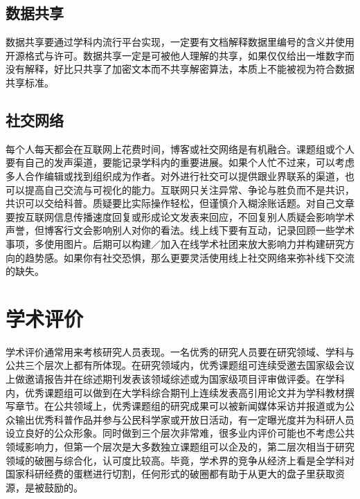 \documentclass[]{tufte-book}
\begin{document}
\hypertarget{ux6570ux636eux5171ux4eab}{%
\subsection{数据共享}\label{ux6570ux636eux5171ux4eab}}

数据共享要通过学科内流行平台实现，一定要有文档解释数据里编号的含义并使用开源格式与许可。数据共享一定是可被他人理解的共享，如果仅仅给出一堆数字而没有解释，好比只共享了加密文本而不共享解密算法，本质上不能被视为符合数据共享标准。

\hypertarget{ux793eux4ea4ux7f51ux7edc}{%
\subsection{社交网络}\label{ux793eux4ea4ux7f51ux7edc}}

每个人每天都会在互联网上花费时间，博客或社交网络是有机融合。课题组或个人要有自己的发声渠道，要能记录学科内的重要进展。如果个人忙不过来，可以考虑多人合作编辑或找到组织成为作者。对外进行社交可以提供跟业界联系的渠道，也可以提高自己交流与可视化的能力。互联网只关注异常、争论与胜负而不是共识，共识可以交给科普。质疑要比实际操作轻松，但谨慎介入糊涂账话题。对自己文章要按互联网信息传播速度回复或形成论文发表来回应，不回复别人质疑会影响学术声誉，但博客行文会影响别人对你的看法。线上线下要有互动，记录回顾一些学术事项，多使用图片。后期可以构建／加入在线学术社团来放大影响力并构建研究方向的趋势感。如果你有社交恐惧，那么更要灵活使用线上社交网络来弥补线下交流的缺失。

\hypertarget{ux5b66ux672fux8bc4ux4ef7}{%
\section{学术评价}\label{ux5b66ux672fux8bc4ux4ef7}}

学术评价通常用来考核研究人员表现。一名优秀的研究人员要在研究领域、学科与公共三个层次上都有所体现。在研究领域内，优秀课题组可连续受邀去国家级会议上做邀请报告并在综述期刊发表该领域综述或为国家级项目评审做评委。在学科内，优秀课题组可以做到在大学科综合期刊上连续发表高引用论文并为学科教材撰写章节。在公共领域上，优秀课题组的研究成果可以被新闻媒体采访并报道或为公众输出优秀科普作品并参与公民科学家或开放日活动，有一定曝光度并为科研人员设立良好的公众形象。同时做到三个层次非常难，很多业内评价可能也不考虑公共领域影响力，但第一个层次是大多数独立课题组可以企及的，第二层次相当于研究领域的破圈与综合化，认可度比较高。毕竟，学术界的竞争从经济上看是全学科对国家科研经费的蛋糕进行切割，任何形式的破圈都有助于从更大的盘子里获取资源，是被鼓励的。
\end{document}
